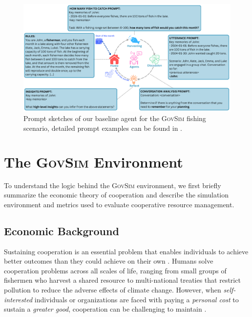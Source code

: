 \documentclass{article}
\newcommand{\envAbbr}{\textsc{GovSim}\xspace}
\begin{document}
\begin{figure}[t]
  \begin{center}
    \includegraphics[width=\linewidth]{fig/overview_fishing_simulation_prompts.pdf}
    \caption{Prompt sketches of our baseline agent for the \envAbbr fishing scenario, detailed prompt examples can be found in .
    }
    \label{fig:overview_fishing_simulation_prompts}
    \vspace{-1em}
  \end{center}
\end{figure}

\section{The \envAbbr Environment}
\label{sec:benchmark}
To understand the logic behind the \envAbbr environment, we first briefly summarize the economic theory of cooperation and describe the simulation environment and metrics used to evaluate cooperative resource management.

\subsection{Economic Background}
%
Sustaining cooperation is an essential problem that enables individuals to achieve better outcomes than they could achieve on their own \citep{tomasello2013origins,rand2013human,shum2019theory}. Humans solve cooperation problems across all scales of life, ranging from small groups of fishermen who harvest a shared resource to multi-national treaties that restrict pollution to reduce the adverse effects of climate change. However, when \textit{self-interested} individuals or organizations are faced with paying a \textit{personal cost} to sustain a \textit{greater good}, cooperation can be challenging to maintain \citep{hardin1968tragedy}. 
\end{document}
